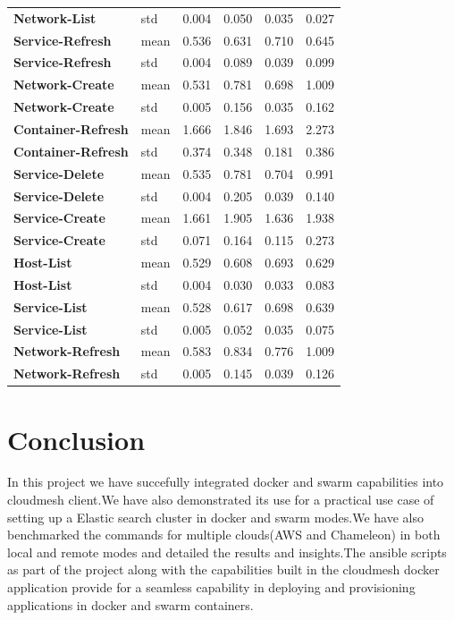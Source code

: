 \documentclass[9pt,twocolumn,twoside]{../../styles/osajnl}
\begin{document}
\begin{table}[h]
\begin{tabular}{|l|l|l|p{.86cm}|l|p{0.86cm}|}
\textbf{Network-List} & std & 0.004 & 0.050 & 0.035 & 0.027 \\
\textbf{Service-Refresh} & mean & 0.536 & 0.631 & 0.710 & 0.645 \\
\textbf{Service-Refresh} & std & 0.004 & 0.089 & 0.039 & 0.099 \\
\textbf{Network-Create} & mean & 0.531 & 0.781 & 0.698 & 1.009 \\
\textbf{Network-Create} & std & 0.005 & 0.156 & 0.035 & 0.162 \\
\textbf{Container-Refresh} & mean & 1.666 & 1.846 & 1.693 & 2.273 \\
\textbf{Container-Refresh} & std & 0.374 & 0.348 & 0.181 & 0.386 \\
\textbf{Service-Delete} & mean & 0.535 & 0.781 & 0.704 & 0.991 \\
\textbf{Service-Delete} & std & 0.004 & 0.205 & 0.039 & 0.140 \\
\textbf{Service-Create} & mean & 1.661 & 1.905 & 1.636 & 1.938 \\
\textbf{Service-Create} & std & 0.071 & 0.164 & 0.115 & 0.273 \\
\textbf{Host-List} & mean & 0.529 & 0.608 & 0.693 & 0.629 \\
\textbf{Host-List} & std & 0.004 & 0.030 & 0.033 & 0.083 \\
\textbf{Service-List} & mean & 0.528 & 0.617 & 0.698 & 0.639 \\
\textbf{Service-List} & std & 0.005 & 0.052 & 0.035 & 0.075 \\
\textbf{Network-Refresh} & mean & 0.583 & 0.834 & 0.776 & 1.009 \\
\textbf{Network-Refresh} & std & 0.005 & 0.145 & 0.039 & 0.126
\end{tabular}
\end{table}

\clearpage
\section{Conclusion}

In this project we have succefully integrated docker and swarm capabilities into
cloudmesh client.We have also demonstrated its use for a practical use case of
setting up a Elastic search cluster in docker and swarm modes.We have also 
benchmarked the commands for multiple clouds(AWS and Chameleon) in both 
local and remote modes and detailed the results and insights.The ansible scripts
as part of the project along with the capabilities built in the cloudmesh docker 
application provide for a seamless capability in deploying and provisioning applications
in docker and swarm containers.
\end{document}
